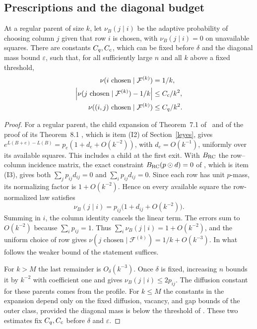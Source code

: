 \subsection{Prescriptions and the diagonal budget}
\begin{lema}\label{meso:paso}
At a regular parent of size $k$, let $\nu_B(j\mid i)$ be the adaptive probability of choosing column $j$
given that row $i$ is chosen, with $\nu_B(j\mid i)=0$ on unavailable squares. There are constants
$C_q,C_{\rm c}$, which can be fixed before $\delta$ and the diagonal mass bound $\varepsilon$, such that,
for all sufficiently large $n$ and all $k$ above a fixed threshold,
\begin{align*}
 \nu(i\text{ chosen}\mid\mathcal F^{(k)})&=1/k,\\
 \left|\nu(j\text{ chosen}\mid\mathcal F^{(k)})-1/k\right|&\le C_{\rm c}/k^2,\\
 \nu((i,j)\text{ chosen}\mid\mathcal F^{(k)})&\le C_q/k^2 .
\end{align*}
\end{lema}
\begin{proof}
For a regular parent, the child expansion of Theorem~7.1 of~\cite{pred} and of the proof of its
Theorem~8.1 \cite[Sections~7.8, 8.2 and~8.5]{pred}, which is item (I2) of Section~\ref{leyes}, gives
$e^{L(B+e)-L(B)}=p_e(1+d_e+O(k^{-2}))$, with $d_e=O(k^{-1})$, uniformly over its available squares.
This includes a child at the first exit. With $B_{\rm RC}$ the row--column incidence matrix, the exact
constraint $B_{\rm RC}(p\odot d)=0$ of \cite[Section~6.1]{pred}, which is item (I3), gives both
$\sum_jp_{ij}d_{ij}=0$ and $\sum_i p_{ij}d_{ij}=0$. Since each row has unit $p$-mass, its normalizing
factor is $1+O(k^{-2})$. Hence on every available square the row-normalized law satisfies
\[
 \nu_B(j\mid i)=p_{ij}\bigl(1+d_{ij}+O(k^{-2})\bigr).
\]
Summing in $i$, the column identity cancels the linear term. The errors sum to $O(k^{-2})$ because
$\sum_i p_{ij}=1$. Thus $\sum_i\nu_B(j\mid i)=1+O(k^{-2})$, and the uniform choice of row gives
$\nu(j\text{ chosen}\mid\mathcal F^{(k)})=1/k+O(k^{-3})$. In what follows the weaker bound of the
statement suffices.

For $k>M$ the last remainder is $O_\delta(k^{-3})$. Once $\delta$ is fixed, increasing $n$ bounds
it by $k^{-2}$ with coefficient one and gives $\nu_B(j\mid i)\le2p_{ij}$. The diffusion constant for
these parents comes from the profile. For $k\le M$ the constants in the expansion depend only on the
fixed diffusion, vacancy, and gap bounds of the outer class, provided the diagonal mass is below the
threshold of \cite[Theorem~8.1]{pred}. These two estimates fix $C_q,C_{\rm c}$ before $\delta$ and
$\varepsilon$.
\end{proof}

